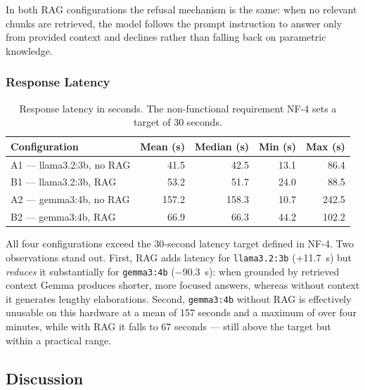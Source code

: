 In both RAG configurations the refusal mechanism is the same: when no relevant
chunks are retrieved, the model follows the prompt instruction to answer only
from provided context and declines rather than falling back on parametric
knowledge.
 
\subsubsection*{Response Latency}
 
\begin{table}[H]
    \centering
    \begin{tabular}{|l|r|r|r|r|}
        \hline
        \textbf{Configuration} & \textbf{Mean (s)} & \textbf{Median (s)} & \textbf{Min (s)} & \textbf{Max (s)} \\
        \hline\hline
        A1 — llama3.2:3b, no RAG &  41.5 &  42.5 & 13.1 &  86.4 \\
        B1 — llama3.2:3b, RAG    &  53.2 &  51.7 & 24.0 &  88.5 \\
        A2 — gemma3:4b,   no RAG & 157.2 & 158.3 & 10.7 & 242.5 \\
        B2 — gemma3:4b,   RAG    &  66.9 &  66.3 & 44.2 & 102.2 \\
        \hline
    \end{tabular}
    \caption{Response latency in seconds. The non-functional requirement NF-4
    sets a target of 30 seconds.}
    \label{tab:eval-latency}
\end{table}
 
All four configurations exceed the 30-second latency target defined in NF-4.
Two observations stand out. First, RAG adds latency for \texttt{llama3.2:3b}
(+11.7~s) but \emph{reduces} it substantially for \texttt{gemma3:4b}
($-$90.3~s): when grounded by retrieved context Gemma produces shorter, more
focused answers, whereas without context it generates lengthy elaborations.
Second, \texttt{gemma3:4b} without RAG is effectively unusable on this
hardware at a mean of 157 seconds and a maximum of over four minutes, while
with RAG it falls to 67 seconds --- still above the target but within a
practical range.


\subsection{Discussion}
\label{sec:eval-discussion}
 
